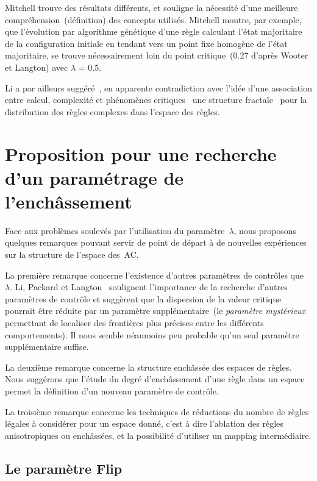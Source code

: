 Mitchell trouve des résultats différents, et souligne la nécessité
d'une meilleure compréhension~(définition) des concepts utilisés. %
Mitchell montre, par exemple, que l'évolution par algorithme génétique
d'une règle calculant l'état majoritaire de la configuration initiale
en tendant vers un point fixe homogène de l'état majoritaire, %
se trouve nécessairement loin du point critique~(0.27 d'après Wooter
et Langton) avec $\lambda$ = 0.5. %

Li a par ailleurs suggéré~\cite[]{Li89}, en apparente contradiction
avec l'idée d'une association entre calcul, complexité et phénomènes
critiques~\cite[]{Li90b} une structure fractale~\cite[]{Mandelbrot84}
pour la distribution des règles complexes dans l'espace des règles.

\section[Le paramétrage d'enchâssement]%
{Proposition pour une recherche d'un paramétrage de l'enchâs\-sement}

Face aux problèmes soulevés par l'utilisation du paramètre~$\lambda$,
nous proposons quelques remarques pouvant servir de point de départ à
de nouvelles expériences sur la structure de l'espace des~AC.

La première remarque concerne l'existence d'autres paramètres
de contrôles que~$\lambda$. %
Li, Packard et Langton~\cite[]{Li90b} soulignent l'importance de la
recherche d'autres paramètres de contrôle et suggèrent que la
dispersion de la valeur critique pourrait être réduite par un
paramètre supplémentaire~(le \emph{paramètre mystérieux} permettant de
localiser des frontières plus précises entre les différents comportements). %
Il nous semble néanmoins peu probable qu'un seul paramètre
supplémentaire suffise.

La deuxième remarque concerne la structure enchâssée des espaces de
règles. %
Nous suggérons que l'étude du degré d'enchâssement d'une règle dans un
espace permet la définition d'un nouveau paramètre de contrôle.

La troisième remarque concerne les techniques de réductions du nombre
de règles légales à considérer pour un espace donné, c'est à dire
l'ablation des règles anisotropiques ou enchâssées, et la possibilité
d'utiliser un mapping intermédiaire.

\subsection*{Le paramètre Flip}

